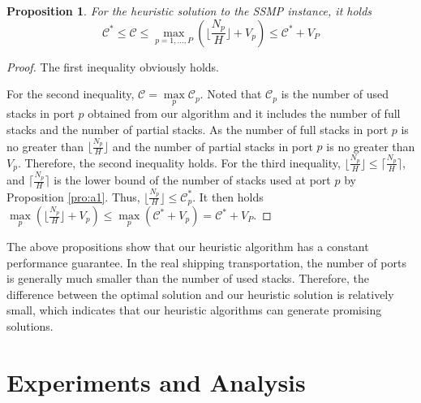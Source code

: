 \documentclass[review,3p,times,authoryear,12pt]{elsarticle}
\newtheorem{proposition}{Proposition}
\begin{document}
\begin{proposition}
For the heuristic solution to the SSMP instance, it holds
\begin{equation*}
\mathcal{C}^* \le \mathcal{C} \le \max_{p=1,\ldots,P}(\lfloor\frac{N_p}{H}\rfloor+V_p) \le \mathcal{C}^*+V_P
\end{equation*}
\label{pro:a3}
\end{proposition}

\begin{proof}

The first inequality obviously holds.

For the second inequality, $\mathcal{C}=\max\limits_p \mathcal{C}_p$.
Noted that $\mathcal{C}_p$ is the number of used stacks in port $p$ obtained from our algorithm and it includes the number of full stacks and the number of partial stacks.
As the number of full stacks in port $p$ is no greater than $\lfloor\frac{N_p}{H}\rfloor$ and the number of partial stacks in port $p$ is no greater than $V_p$.
Therefore, the second inequality holds.
For the third inequality, $\lfloor\frac{N_p}{H}\rfloor\leq \lceil\frac{N_p}{H}\rceil$, and $\lceil\frac{N_p}{H}\rceil$ is the lower bound of the number of stacks used at port $p$ by Proposition \ref{pro:a1}.
Thus, $\lfloor\frac{N_p}{H}\rfloor \le \mathcal{C}_p^*$.
It then holds $\max\limits_p(\lfloor\frac{N_p}{H}\rfloor+V_p) \le \max\limits_p(\mathcal{C}^*+V_p) = \mathcal{C}^*+V_P$.
\end{proof}


The above propositions show that our heuristic algorithm has a constant performance guarantee.
In the real shipping transportation, the number of ports is generally much smaller than the number of used stacks.
Therefore, the difference between the optimal solution and our heuristic solution is relatively small, which indicates that our heuristic algorithms can generate promising solutions.


\section{Experiments and Analysis}
\label{sec:ea}
\end{document}
